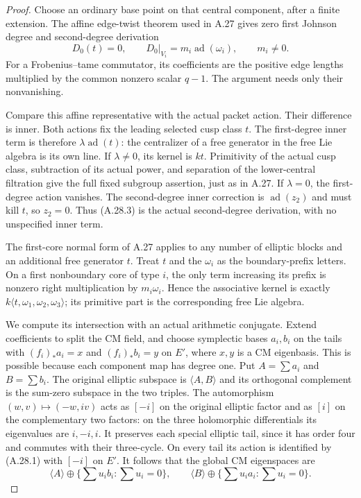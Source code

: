 \begin{proof}
Choose an ordinary base point on that central component, after a
finite extension. The affine edge-twist theorem used in A.27 gives
zero first Johnson degree and second-degree derivation
\[
 D_0(t)=0,\qquad D_0|_{V_i}=m_i\operatorname{ad}(\omega_i),
                     \qquad m_i\ne0.                   \tag{A.28.3}
\]
For a Frobenius--tame commutator, its coefficients are the positive
edge lengths multiplied by the common nonzero scalar $q-1$.
The argument needs only their nonvanishing.

Compare this affine representative with the actual packet action.
Their difference is inner. Both actions fix the leading selected
cusp class $t$. The first-degree inner term is therefore
$\lambda\operatorname{ad}(t)$: the centralizer of a free generator
in the free Lie algebra is its own line. If $\lambda\ne0$, its
kernel is $kt$. Primitivity of the actual cusp class, subtraction
of its actual power, and separation of the lower-central filtration
give the full fixed subgroup assertion, just as in A.27.
If $\lambda=0$, the first-degree action vanishes. The second-degree
inner correction is $\operatorname{ad}(z_2)$ and must kill $t$,
so $z_2=0$. Thus (A.28.3) is the actual second-degree derivation,
with no unspecified inner term.

The first-core normal form of A.27 applies to any number of elliptic
blocks and an additional free generator $t$. Treat $t$ and the
$\omega_i$ as the boundary-prefix letters. On a first nonboundary
core of type $i$, the only term increasing its prefix is nonzero
right multiplication by $m_i\omega_i$. Hence the associative
kernel is exactly $k\langle t,\omega_1,\omega_2,\omega_3\rangle$;
its primitive part is the corresponding free Lie algebra.

We compute its intersection with an actual arithmetic conjugate.
Extend coefficients to split the CM field, and choose symplectic
bases $a_i,b_i$ on the tails with $(f_i)_*a_i=x$ and
$(f_i)_*b_i=y$ on $E'$, where $x,y$ is a CM eigenbasis. This is
possible because each component map has degree one. Put
$A=\sum a_i$ and $B=\sum b_i$.
The original elliptic subspace is $\langle A,B\rangle$ and its
orthogonal complement is the sum-zero subspace in the two triples.
The automorphism $(w,v)\mapsto(-w,iv)$ acts as $[-i]$ on the
original elliptic factor and as $[i]$ on the complementary two
factors: on the three holomorphic differentials its eigenvalues
are $i,-i,i$. It preserves each special elliptic tail, since it
has order four and commutes with their three-cycle. On every tail
its action is identified by (A.28.1) with $[-i]$ on $E'$.
It follows that the global CM eigenspaces are
\[
          \langle A\rangle\oplus\{\textstyle\sum u_i b_i:
                        \sum u_i=0\},\qquad
          \langle B\rangle\oplus\{\textstyle\sum u_i a_i:
                        \sum u_i=0\}.                  \tag{A.28.4}
\]


\end{proof}
